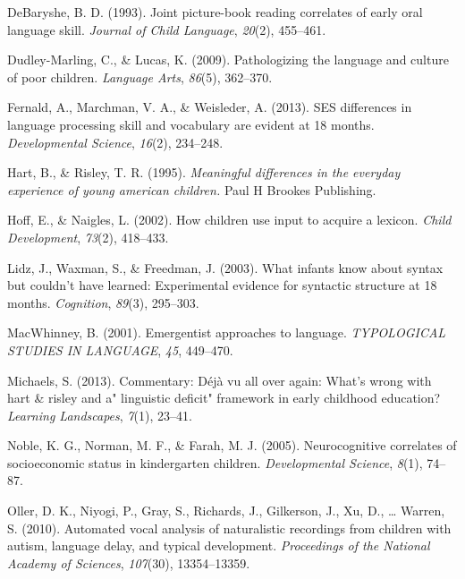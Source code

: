 \documentclass[floatsintext,man]{apa6}
\theoremstyle{definition}
\theoremstyle{definition}
\theoremstyle{definition}
\theoremstyle{remark}
\begin{document}
\leavevmode\hypertarget{ref-debaryshe1993joint}{}%
DeBaryshe, B. D. (1993). Joint picture-book reading correlates of early
oral language skill. \emph{Journal of Child Language}, \emph{20}(2),
455--461.

\leavevmode\hypertarget{ref-dudley2009pathologizing}{}%
Dudley-Marling, C., \& Lucas, K. (2009). Pathologizing the language and
culture of poor children. \emph{Language Arts}, \emph{86}(5), 362--370.

\leavevmode\hypertarget{ref-fernald2013ses}{}%
Fernald, A., Marchman, V. A., \& Weisleder, A. (2013). SES differences
in language processing skill and vocabulary are evident at 18 months.
\emph{Developmental Science}, \emph{16}(2), 234--248.

\leavevmode\hypertarget{ref-hart1995meaningful}{}%
Hart, B., \& Risley, T. R. (1995). \emph{Meaningful differences in the
everyday experience of young american children.} Paul H Brookes
Publishing.

\leavevmode\hypertarget{ref-hoff2002children}{}%
Hoff, E., \& Naigles, L. (2002). How children use input to acquire a
lexicon. \emph{Child Development}, \emph{73}(2), 418--433.

\leavevmode\hypertarget{ref-lidz2003infants}{}%
Lidz, J., Waxman, S., \& Freedman, J. (2003). What infants know about
syntax but couldn't have learned: Experimental evidence for syntactic
structure at 18 months. \emph{Cognition}, \emph{89}(3), 295--303.

\leavevmode\hypertarget{ref-macwhinney2001emergentist}{}%
MacWhinney, B. (2001). Emergentist approaches to language.
\emph{TYPOLOGICAL STUDIES IN LANGUAGE}, \emph{45}, 449--470.

\leavevmode\hypertarget{ref-michaels2013commentary}{}%
Michaels, S. (2013). Commentary: Déjà vu all over again: What's wrong
with hart \& risley and a" linguistic deficit" framework in early
childhood education? \emph{Learning Landscapes}, \emph{7}(1), 23--41.

\leavevmode\hypertarget{ref-noble2005neurocognitive}{}%
Noble, K. G., Norman, M. F., \& Farah, M. J. (2005). Neurocognitive
correlates of socioeconomic status in kindergarten children.
\emph{Developmental Science}, \emph{8}(1), 74--87.

\leavevmode\hypertarget{ref-oller2010automated}{}%
Oller, D. K., Niyogi, P., Gray, S., Richards, J., Gilkerson, J., Xu, D.,
\ldots{} Warren, S. (2010). Automated vocal analysis of naturalistic
recordings from children with autism, language delay, and typical
development. \emph{Proceedings of the National Academy of Sciences},
\emph{107}(30), 13354--13359.
\end{document}
